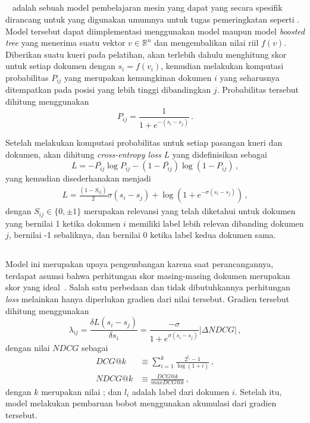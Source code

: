 \subsection{\ranknet{}}
\label{subbab:2:RankNet}
\ranknet{}~\citep{burges2010ranknet} adalah sebuah model pembelajaran mesin yang dapat  yang secara spesifik dirancang untuk \ltr{} yang digunakan umumnya untuk tugas pemeringkatan seperti \ir{}. Model tersebut dapat diimplementasi menggunakan model \nn{} maupun model \textit{boosted tree} yang menerima suatu vektor $v \in{} \mathbb{R}^n$ dan mengembalikan nilai riil $f(v)$. Diberikan suatu kueri pada pelatihan, \ranknet{} akan terlebih dahulu menghitung skor untuk setiap dokumen dengan $s_{i}=f(v_{i})$, kemudian melakukan komputasi probabilitas $P_{ij}$ yang merupakan kemungkinan dokumen $i$ yang seharusnya ditempatkan pada posisi yang lebih tinggi dibandingkan $j$. Probabilitas tersebut dihitung menggunakan
\[
P_{ij} = \frac{1}{1+e^{-(s_i-s_j)}} \, .
\]

Setelah melakukan komputasi probabilitas untuk setiap pasangan kueri dan dokumen, akan dihitung \textit{cross-entropy loss} $L$ yang didefinisikan sebagai
\[
L=-\bar{P_{ij}}\log{P_{ij}}-(1-\bar{P_{ij}})\log(1-P_{ij}) \, ,
\]
yang kemudian disederhanakan menjadi 
\begin{align*}
L=\frac{(1-S_{ij})}{2}\sigma{}(s_i-s_j)+\log{}(1+e^{-\sigma{}(s_i-s_j)}) \, ,
\end{align*}
dengan $S_{ij}\in{}\{0,\pm{}1\}$ merupakan relevansi yang telah diketahui untuk dokumen yang bernilai 1 ketika dokumen $i$ memiliki label lebih relevan dibanding dokumen $j$, bernilai -1 sebaliknya, dan bernilai 0 ketika label kedua dokumen sama.

\subsection{\lambdarank{}}
\label{subbab:2:LambdaRank}
Model ini merupakan upaya pengembangan \ranknet{} karena saat perancangannya, terdapat asumsi bahwa perhitungan skor masing-masing dokumen merupakan skor yang ideal~\citep{burges2010ranknet}. Salah satu perbedaan \lambdarank{} dan \ranknet{} tidak dibutuhkannya perhitungan \textit{loss} melainkan hanya diperlukan gradien dari nilai tersebut. Gradien tersebut dihitung menggunakan
\[
\lambda_{ij}=\frac{\delta{}L(s_i-s_j)}{\delta{}s_i}=\frac{-\sigma{}}{1+e^{\sigma{}(s_i-s_j)}}|\Delta{}NDCG| \, ,
\]
dengan nilai $NDCG$ sebagai
\begin{align*}
DCG@k&\equiv{}\sum^k_{i=1} \frac{2^{l_i}-1}{\log(1+i)} \, ,\\
NDCG@k&\equiv{}\frac{DCG@k}{maxDCG@k} \, ,
\end{align*}
dengan $k$ merupakan nilai \cutoff{}; dan $l_i$ adalah label dari dokumen $i$. Setelah itu, model melakukan pembaruan bobot menggunakan akumulasi dari gradien tersebut.

